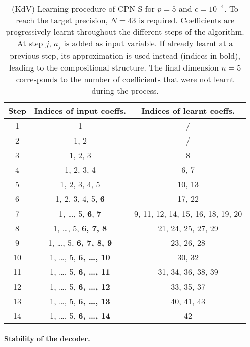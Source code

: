 \begin{table}[H]
\centering %

\begin{tabular}{|c|c|c|}
\hline
\textbf{Step} & \textbf{Indices of input coeffs.} & \textbf{Indices of learnt coeffs.} \\
\hline
1 & 1 & / \\
\hline
2 & 1, 2 & / \\
\hline
3 & 1, 2, 3 & 8 \\
\hline
4 & 1, 2, 3, 4 & 6, 7 \\
\hline
5 & 1, 2, 3, 4, 5 & 10, 13 \\
\hline
6 & 1, 2, 3, 4, 5, \textbf 6 & 17, 22 \\
\hline
7 & 1, \ldots, 5, \textbf 6, \textbf 7 & 9, 11, 12, 14, 15, 16, 18, 19, 20 \\
\hline
8 & 1, \ldots, 5, \textbf{6, 7, 8} & 21, 24, 25, 27, 29 \\
\hline
9 & 1, \ldots, 5, \textbf{6, 7, 8, 9} & 23, 26, 28 \\
\hline
10 & 1, \ldots, 5, \textbf{6, \ldots, 10} & 30, 32 \\
\hline
11 & 1, \ldots, 5, \textbf{6, \ldots, 11} & 31, 34, 36, 38, 39 \\
\hline
12 & 1, \ldots, 5, \textbf{6, \ldots, 12} & 33, 35, 37 \\
\hline
13 & 1, \ldots, 5, \textbf{6, \ldots, 13} & 40, 41, 43 \\
\hline
14 & 1, \ldots, 5, \textbf{6, \ldots, 14} & 42 \\
\hline
\end{tabular}
\caption{(KdV) Learning procedure of CPN-S for $ p = 5 $ and $ \epsilon = 10^{-4}$. To reach the target precision,  $N=43$ is required. Coefficients are progressively learnt throughout the different steps of the algorithm. At step $ j $, $ a_j $ is added as input variable. If already learnt at a previous step, its approximation is used instead (indices in bold), leading to the compositional structure. The final dimension $ n = 5 $ corresponds to the number of coefficients that were not learnt during the process.}
\label{tab:kdv_learning_process}
\end{table}



\paragraph{Stability of the decoder.}

